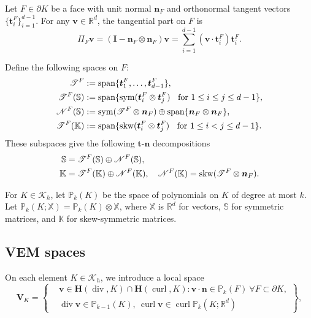 \documentclass[review,hidelinks,onefignum,onetabnum]{siamart251216}
\newcommand{\sym}{\operatorname{sym}}
\begin{document}
Let $F \in \partial K$ be a face with unit normal $\boldsymbol{n}_F$ and orthonormal tangent vectors $\{\boldsymbol{t}_i^{F}\}_{i=1}^{d-1}$. For any $\boldsymbol{v}\in\mathbb{R}^d$, the tangential part on $F$ is
$$
\Pi_F \boldsymbol{v}=(\boldsymbol{I}-\boldsymbol{n}_F\otimes\boldsymbol{n}_F)\boldsymbol{v}
=\sum_{i=1}^{d-1}(\boldsymbol{v}\cdot\boldsymbol{t}_i^{F})\boldsymbol{t}_i^{F}.
$$

Define the following spaces on $F$:
\begin{align*}
\mathscr T^F&:=\textrm{span}\{\boldsymbol{t}_1^F, \ldots, \boldsymbol{t}_{d-1}^F\}, \\
\mathscr T^F(\mathbb S)&:=\textrm{span}\{{\rm sym}(\boldsymbol{t}_i^F\otimes \boldsymbol{t}_j^F) \;\;\textrm{ for } 1\leq i\leq j\leq d-1\}, \\
\mathscr N^F(\mathbb S) &:= \sym(\mathscr T^F\otimes\boldsymbol{n}_F)\oplus {\rm span}\{\boldsymbol{n}_F\otimes\boldsymbol{n}_F\},\\
\mathscr T^F(\mathbb K)&:=\textrm{span}\{{\rm skw}(\boldsymbol{t}_i^F\otimes \boldsymbol{t}_j^F) \;\;\textrm{ for } 1\leq i< j\leq d-1\}.
\end{align*}
These subspaces give the following $\boldsymbol{t}$-$\boldsymbol{n}$ decompositions
\begin{align}\label{eq:decS}
\mathbb S&= \mathscr T^F(\mathbb S)\oplus \mathscr N^F(\mathbb S), \quad 
\\
\mathbb K&= \mathscr T^F(\mathbb K)\oplus \mathscr N^F(\mathbb K), \quad \mathscr N^F(\mathbb K)={\rm skw}(\mathscr T^F\otimes\boldsymbol{n}_F).
\end{align}


For \(K \in \mathcal{K}_h\), let \(\mathbb{P}_k(K)\) be the space of polynomials on \(K\) of degree at most \(k\). Let \(\mathbb{P}_k(K; \mathbb{X}) = \mathbb{P}_k(K) \otimes \mathbb{X}\), where \(\mathbb{X}\) is \(\mathbb{R}^d\) for vectors, \(\mathbb{S}\) for symmetric matrices, and \(\mathbb{K}\) for skew-symmetric matrices.

\subsection{VEM spaces}


On each element \(K\in\mathcal{K}_h\),  we introduce a local space
\begin{equation*}
\boldsymbol{V}_K = \left\{ 
\begin{aligned}
& \boldsymbol{v} \in \boldsymbol{H}(\operatorname{div}, K) \cap \boldsymbol{H}(\operatorname{curl}, K) : \boldsymbol{v} \cdot \boldsymbol{n} \in \mathbb{P}_k(F) \ \forall F \subset \partial K, \\
& \operatorname{div} \boldsymbol{v} \in \mathbb{P}_{k-1}(K), \ \operatorname{curl} \boldsymbol{v} \in \operatorname{curl} \mathbb{P}_k(K;\mathbb{R}^d)
\end{aligned}
\right\},
\end{equation*}
\end{document}
